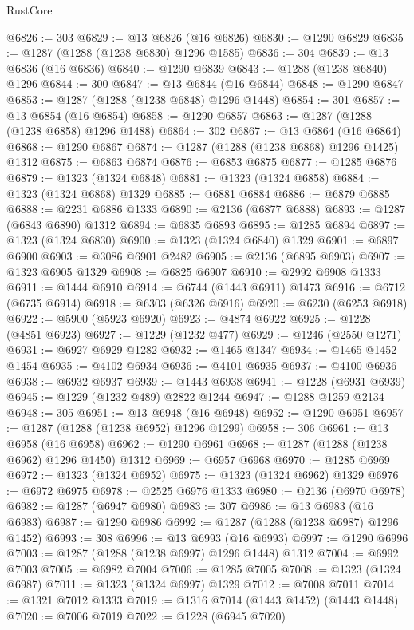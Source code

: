 \begin{lexlean}{RustCore}
\begin{coremodule}
@6826 := 303
@6829 := @13 @6826 (@16 @6826)
@6830 := @1290 @6829
@6835 := @1287 (@1288 (@1238 @6830) @1296 @1585)
@6836 := 304
@6839 := @13 @6836 (@16 @6836)
@6840 := @1290 @6839
@6843 := @1288 (@1238 @6840) @1296
@6844 := 300
@6847 := @13 @6844 (@16 @6844)
@6848 := @1290 @6847
@6853 := @1287 (@1288 (@1238 @6848) @1296 @1448)
@6854 := 301
@6857 := @13 @6854 (@16 @6854)
@6858 := @1290 @6857
@6863 := @1287 (@1288 (@1238 @6858) @1296 @1488)
@6864 := 302
@6867 := @13 @6864 (@16 @6864)
@6868 := @1290 @6867
@6874 := @1287 (@1288 (@1238 @6868) @1296 @1425) @1312
@6875 := @6863 @6874
@6876 := @6853 @6875
@6877 := @1285 @6876
@6879 := @1323 (@1324 @6848)
@6881 := @1323 (@1324 @6858)
@6884 := @1323 (@1324 @6868) @1329
@6885 := @6881 @6884
@6886 := @6879 @6885
@6888 := @2231 @6886 @1333
@6890 := @2136 (@6877 @6888)
@6893 := @1287 (@6843 @6890) @1312
@6894 := @6835 @6893
@6895 := @1285 @6894
@6897 := @1323 (@1324 @6830)
@6900 := @1323 (@1324 @6840) @1329
@6901 := @6897 @6900
@6903 := @3086 @6901 @2482
@6905 := @2136 (@6895 @6903)
@6907 := @1323 @6905 @1329
@6908 := @6825 @6907
@6910 := @2992 @6908 @1333
@6911 := @1444 @6910
@6914 := @6744 (@1443 @6911) @1473
@6916 := @6712 (@6735 @6914)
@6918 := @6303 (@6326 @6916)
@6920 := @6230 (@6253 @6918)
@6922 := @5900 (@5923 @6920)
@6923 := @4874 @6922
@6925 := @1228 (@4851 @6923)
@6927 := @1229 (@1232 @477)
@6929 := @1246 (@2550 @1271)
@6931 := @6927 @6929 @1282
@6932 := @1465 @1347
@6934 := @1465 @1452 @1454
@6935 := @4102 @6934
@6936 := @4101 @6935
@6937 := @4100 @6936
@6938 := @6932 @6937
@6939 := @1443 @6938
@6941 := @1228 (@6931 @6939)
@6945 := @1229 (@1232 @489) @2822 @1244
@6947 := @1288 @1259 @2134
@6948 := 305
@6951 := @13 @6948 (@16 @6948)
@6952 := @1290 @6951
@6957 := @1287 (@1288 (@1238 @6952) @1296 @1299)
@6958 := 306
@6961 := @13 @6958 (@16 @6958)
@6962 := @1290 @6961
@6968 := @1287 (@1288 (@1238 @6962) @1296 @1450) @1312
@6969 := @6957 @6968
@6970 := @1285 @6969
@6972 := @1323 (@1324 @6952)
@6975 := @1323 (@1324 @6962) @1329
@6976 := @6972 @6975
@6978 := @2525 @6976 @1333
@6980 := @2136 (@6970 @6978)
@6982 := @1287 (@6947 @6980)
@6983 := 307
@6986 := @13 @6983 (@16 @6983)
@6987 := @1290 @6986
@6992 := @1287 (@1288 (@1238 @6987) @1296 @1452)
@6993 := 308
@6996 := @13 @6993 (@16 @6993)
@6997 := @1290 @6996
@7003 := @1287 (@1288 (@1238 @6997) @1296 @1448) @1312
@7004 := @6992 @7003
@7005 := @6982 @7004
@7006 := @1285 @7005
@7008 := @1323 (@1324 @6987)
@7011 := @1323 (@1324 @6997) @1329
@7012 := @7008 @7011
@7014 := @1321 @7012 @1333
@7019 := @1316 @7014 (@1443 @1452) (@1443 @1448)
@7020 := @7006 @7019
@7022 := @1228 (@6945 @7020)

\end{coremodule}
\end{lexlean}
